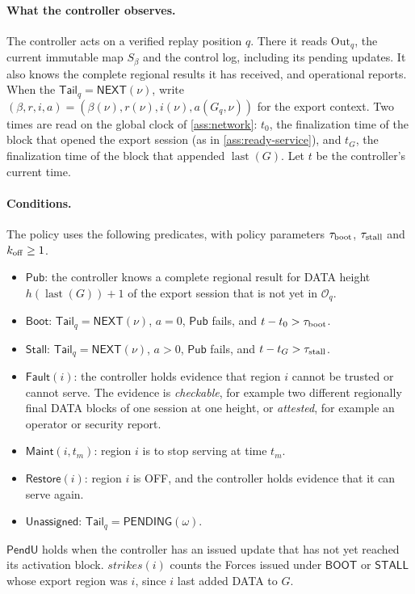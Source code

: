 \documentclass[11pt,a4paper]{article}
\newcommand{\tagg}[1]{\ensuremath{\mathsf{#1}}}
\begin{document}
\paragraph{What the controller observes.}
The controller acts on a verified replay position $q$. There it reads
$\mathrm{Out}_q$, the current immutable map $S_\beta$ and the
control log, including its pending updates. It also knows the complete
regional results it has received, and operational reports. When the
$\mathsf{Tail}_q=\tagg{NEXT}(\nu)$, write
$(\beta,r,i,a)=(\beta(\nu),r(\nu),i(\nu),a(G_q,\nu))$
for the export context. Two times are read on the global clock of
\cref{ass:network}: $t_0$, the finalization time of the block
that opened the export session (as in \cref{ass:ready-service}), and
$t_G$, the finalization time of the block that appended
$\operatorname{last}(G)$. Let $t$ be the controller's current time.

\paragraph{Conditions.}
The policy uses the following predicates, with policy parameters
$\tau_{\rm boot}$, $\tau_{\rm stall}$ and $k_{\rm off}\ge1$.
\begin{itemize}
\item $\tagg{Pub}$: the controller knows a complete regional result for
DATA height $h(\operatorname{last}(G))+1$ of the export session that is
not yet in $\mathcal O_q$.
\item $\tagg{Boot}$: $\mathsf{Tail}_q=\tagg{NEXT}(\nu)$, $a=0$, $\tagg{Pub}$ fails,
and $t-t_0>\tau_{\rm boot}$.
\item $\tagg{Stall}$: $\mathsf{Tail}_q=\tagg{NEXT}(\nu)$, $a>0$, $\tagg{Pub}$ fails,
and $t-t_G>\tau_{\rm stall}$.
\item $\tagg{Fault}(i)$: the controller holds evidence that region $i$
cannot be trusted or cannot serve. The evidence is \emph{checkable}, for
example two different regionally final DATA blocks of one session at one
height, or \emph{attested}, for example an operator or security report.
\item $\tagg{Maint}(i,t_m)$: region $i$ is to stop serving at time $t_m$.
\item $\tagg{Restore}(i)$: region $i$ is OFF, and the controller holds
evidence that it can serve again.
\item $\tagg{Unassigned}$: $\mathsf{Tail}_q=\tagg{PENDING}(\omega)$.
\end{itemize}
$\tagg{PendU}$ holds when the controller has an issued update that has
not yet reached its activation block. $\mathit{strikes}(i)$ counts the
Forces issued under \tagg{BOOT} or \tagg{STALL} whose export region was
$i$, since $i$ last added DATA to $G$.
\end{document}
